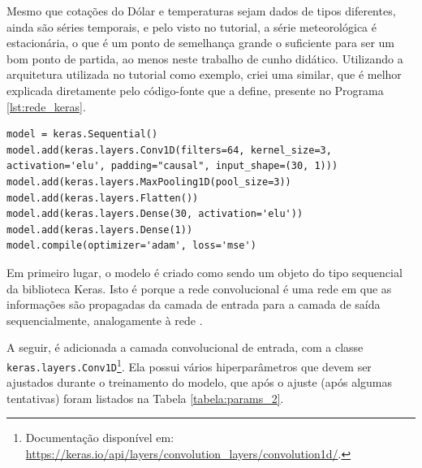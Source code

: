Mesmo que cotações do Dólar e temperaturas sejam dados de tipos diferentes, ainda são séries temporais, e pelo visto no tutorial, a série meteorológica é estacionária, o que é um ponto de semelhança grande o suficiente para ser um bom ponto de partida, ao menos neste trabalho de cunho didático. Utilizando a arquitetura utilizada no tutorial como exemplo, criei uma similar, que é melhor explicada diretamente pelo código-fonte que a define, presente no Programa \ref{lst:rede_keras}.
\newline
\estiloR
\begin{lstlisting}[caption={Definição da arquitetura da rede neural convolucional}, label={lst:rede_keras}, escapeinside={\%}]
model = keras.Sequential()
model.add(keras.layers.Conv1D(filters=64, kernel_size=3, activation='elu', padding="causal", input_shape=(30, 1)))
model.add(keras.layers.MaxPooling1D(pool_size=3))
model.add(keras.layers.Flatten())
model.add(keras.layers.Dense(30, activation='elu'))
model.add(keras.layers.Dense(1))
model.compile(optimizer='adam', loss='mse')
\end{lstlisting}

Em primeiro lugar, o modelo é criado como sendo um objeto do tipo sequencial da biblioteca Keras. Isto é porque a rede convolucional é uma rede em que as informações são propagadas da camada de entrada para a camada de saída sequencialmente, analogamente à rede .

A seguir, é adicionada a camada convolucional de entrada, com a classe \texttt{keras.layers.Conv1D}\footnote{Documentação disponível em: \url{https://keras.io/api/layers/convolution_layers/convolution1d/}.}. Ela possui vários hiperparâmetros que devem ser ajustados durante o treinamento do modelo, que após o ajuste (após algumas tentativas) foram listados na Tabela \ref{tabela:params_2}.

